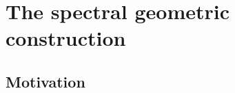 \documentclass[12pt]{article}
\newtheorem{lem}[theorem]{Lemma}
\newcommand{\id}{{\tt id}}
\newcommand{\cX}{{\mathcal{X}}}
\def\hB{\hspace*{\fill}$\Box$ \newline\noindent}
\newcommand{\proof}{{\it Proof.$\:\:\:\:$}}
\begin{document}


%



 
 








 




 



  





  



\section{The spectral geometric construction}\label{sec333}

\subsection{Motivation}
 
\end{document}
